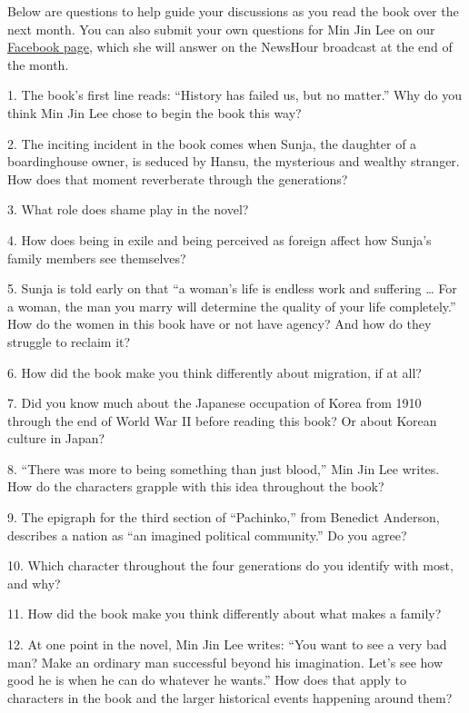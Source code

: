 Below are questions to help guide your discussions as you read the book
over the next month. You can also submit your own questions for Min Jin
Lee on our
\href{https://www.facebookcorewwwi.onion/groups/NowReadThisBookClub}{Facebook
page}, which she will answer on the NewsHour broadcast at the end of the
month.

1. The book's first line reads: ``History has failed us, but no
matter.'' Why do you think Min Jin Lee chose to begin the book this way?

2. The inciting incident in the book comes when Sunja, the daughter of a
boardinghouse owner, is seduced by Hansu, the mysterious and wealthy
stranger. How does that moment reverberate through the generations?

3. What role does shame play in the novel?

4. How does being in exile and being perceived as foreign affect how
Sunja's family members see themselves?

5. Sunja is told early on that ``a woman's life is endless work and
suffering \ldots{} For a woman, the man you marry will determine the
quality of your life completely.'' How do the women in this book have or
not have agency? And how do they struggle to reclaim it?

6. How did the book make you think differently about migration, if at
all?

7. Did you know much about the Japanese occupation of Korea from 1910
through the end of World War II before reading this book? Or about
Korean culture in Japan?

8. ``There was more to being something than just blood,'' Min Jin Lee
writes. How do the characters grapple with this idea throughout the
book?

9. The epigraph for the third section of ``Pachinko,'' from Benedict
Anderson, describes a nation as ``an imagined political community.'' Do
you agree?

10. Which character throughout the four generations do you identify with
most, and why?

11. How did the book make you think differently about what makes a
family?

12. At one point in the novel, Min Jin Lee writes: ``You want to see a
very bad man? Make an ordinary man successful beyond his imagination.
Let's see how good he is when he can do whatever he wants.'' How does
that apply to characters in the book and the larger historical events
happening around them?

